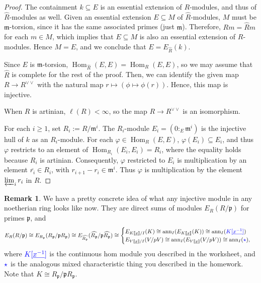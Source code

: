 \documentclass[11pt]{book}
\numberwithin{equation}{section}
\numberwithin{theorem}{chapter}
\theoremstyle{definition}
\newtheorem*{basic properties}{Basic Properties}
\newtheorem*{Important Remark}{Important Remark}
\newtheorem{remark}[theorem]{Remark}
\theoremstyle{remark}
\newcommand{\m}{\mathfrak{m}}
\newcommand{\p}{\mathfrak{p}}
\newcommand{\Hom}{\operatorname{Hom}}
\newcommand{\ann}{\operatorname{ann}}
\newcommand{\blue}[1]{\color {blue} #1}
\begin{document}
\begin{proof}
The containment $k \subseteq E$ is an essential extension of $R$-modules, and thus of $\widehat{R}$-modules as well. Given an essential extension $E \subseteq M$ of $\widehat{R}$-modules, $M$ must be $\m$-torsion, since it has the same associated primes (just $\m$). Therefore, $R m = \widehat{R} m$ for each $m \in M$, which implies that $E \subseteq M$ is also an essential extension of $R$-modules. Hence $M = E$, and we conclude that $E = E_{\widehat{R}} (k)$.


Since $E$ is $\m$-torsion, $\Hom_{\widehat{R}}(E,E) = \Hom_R(E,E)$, so we may assume that $\widehat{R}$ is complete for the rest of the proof. Then, we can identify the given map $R\to R^{\vee\vee}$ with the natural map $r\mapsto(\phi \mapsto \phi(r))$. Hence, this map is injective.


When $R$ is artinian, $\ell(R)<\infty$, so the map $R\to R^{\vee\vee}$ is an isomorphism.

For each $i \geqslant 1$, set $R_i := R/\m^i$. The $R_i$-module $E_i = (0 :_E \m^i)$ is the injective hull of $k$ as an $R_i$-module. For each $\varphi \in \Hom_R(E,E)$, $\varphi(E_i) \subseteq E_i$, and thus $\varphi$ restricts to an element of $\Hom_{R_i}(E_i,E_i) = R_i$, where the equality holds because $R_i$ is artinian. Consequently, $\varphi$ restricted to $E_i$ is multiplication by an element $\overline{r_i} \in R_i$, with $r_{i+1} - r_i \in \m^i$. Thus $\varphi$ is multiplication by the element $\varprojlim_i r_i$ in $R$.
\end{proof}

\begin{remark}
	We have a pretty concrete idea of what any injective module in any noetherian ring looks like now. They are direct sums of modules $E_R(R/\p)$ for primes $\p$, and
	\[ E_R(R/\p) \cong E_{R_\p}(R_\p / \p R_\p) \cong  E_{\widehat{R_\p}}(\widehat{R_\p} / \p \widehat{R_\p}) \cong \begin{cases} E_{K \llbracket \underline{x} \rrbracket/I}(K) \cong \ann_I(E_{K\llbracket \underline{x} \rrbracket}(K)) \cong \ann_I({\blue{K[\underline{x^{-1}}]}}) \\ E_{V\llbracket \underline{x} \rrbracket/I}(V/pV) \cong \ann_I(E_{V\llbracket \underline{x} \rrbracket}(V/pV)) \cong \ann_I({\blue{\star}}),
	\end{cases}\]
	where ${\blue{K[\underline{x^{-1}}]}}$ is the continuous hom module you described in the worksheet, and ${\blue{\star}}$ is the analogous mixed characteristic thing you described in the homework. Note that $K\cong R_\p / \p R_\p$.
\end{remark}
\end{document}
